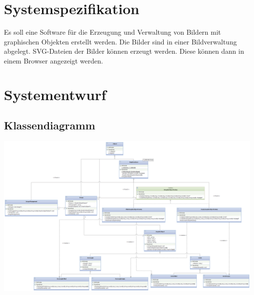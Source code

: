 \documentclass[12pt,a4paper]{article}
\begin{document}
\section{Systemspezifikation}

Es soll eine Software für die Erzeugung und Verwaltung von Bildern mit graphischen Objekten erstellt werden. Die Bilder sind in einer Bildverwaltung abgelegt. SVG-Dateien der Bilder können erzeugt werden. Diese können dann in einem Browser angezeigt werden.
\\

\newpage
\section {Systementwurf}

\subsection {Klassendiagramm}

\includegraphics[angle=90,scale=0.4] {../Klassendiagramm.png}

\newpage
\end{document}
